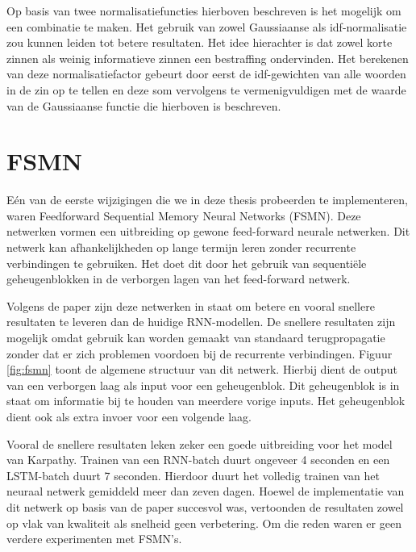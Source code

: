 Op basis van twee normalisatiefuncties hierboven beschreven is het mogelijk om een combinatie te maken. Het gebruik van zowel Gaussiaanse als idf-normalisatie zou kunnen leiden tot betere resultaten. Het idee hierachter is dat zowel korte zinnen als weinig informatieve zinnen een bestraffing ondervinden. Het berekenen van deze normalisatiefactor gebeurt door eerst de idf-gewichten van alle woorden in de zin op te tellen en deze som vervolgens te vermenigvuldigen met de waarde van de Gaussiaanse functie die hierboven is beschreven.

\section{FSMN}
E\'en van de eerste wijzigingen die we in deze thesis probeerden te implementeren, waren Feedforward Sequential Memory Neural Networks (FSMN)\cite{Zhang}. Deze netwerken vormen een uitbreiding op gewone feed-forward neurale netwerken. Dit netwerk kan afhankelijkheden op lange termijn leren zonder recurrente verbindingen te gebruiken. Het doet dit door het gebruik van sequenti\"ele geheugenblokken in de verborgen lagen van het feed-forward netwerk. 

Volgens de paper zijn deze netwerken in staat om betere en vooral snellere resultaten te leveren dan de huidige RNN-modellen. De snellere resultaten zijn mogelijk omdat gebruik kan worden gemaakt van standaard terugpropagatie zonder dat er zich problemen voordoen bij de recurrente verbindingen. Figuur \ref{fig:fsmn} toont de  algemene structuur van dit netwerk. Hierbij dient de output van een verborgen laag als input voor een geheugenblok. Dit geheugenblok is in staat om informatie bij te houden van meerdere vorige inputs. Het geheugenblok dient ook als extra invoer voor een volgende laag.

Vooral de snellere resultaten leken zeker een goede uitbreiding voor het model van Karpathy. Trainen van een RNN-batch duurt ongeveer 4 seconden en een LSTM-batch duurt 7 seconden. Hierdoor duurt het volledig trainen van het neuraal netwerk gemiddeld meer dan zeven dagen.
Hoewel de implementatie van dit netwerk op basis van de paper succesvol was, vertoonden de resultaten zowel op vlak van kwaliteit als snelheid geen verbetering. Om die reden waren er geen verdere experimenten met FSMN's.

